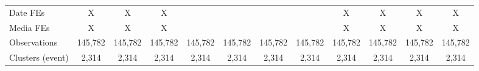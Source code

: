 {\begin{tabular}{l*{11}{c}}
\hline
Date FEs            &           X         &           X         &           X         &                     &                     &                     &                     &           X         &           X         &           X         &           X         \\
Media FEs           &           X         &           X         &           X         &                     &                     &                     &                     &           X         &           X         &           X         &           X         \\
Observations        &     145,782         &     145,782         &     145,782         &     145,782         &     145,782         &     145,782         &     145,782         &     145,782         &     145,782         &     145,782         &     145,782         \\
Clusters (event)    &       2,314         &       2,314         &       2,314         &       2,314         &       2,314         &       2,314         &       2,314         &       2,314         &       2,314         &       2,314         &       2,314         \\
\hline\hline
\end{tabular}
}
